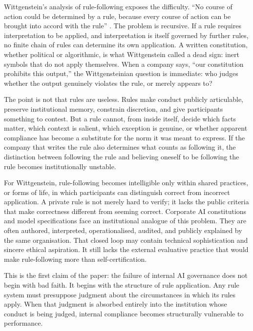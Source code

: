 \documentclass[11pt,a4paper]{article}
\begin{document}
Wittgenstein's analysis of rule-following exposes the difficulty. ``No course of action could be determined by a rule, because every course of action can be brought into accord with the rule'' \citep[\S201]{wittgenstein1953investigations}. The problem is recursive. If a rule requires interpretation to be applied, and interpretation is itself governed by further rules, no finite chain of rules can determine its own application. A written constitution, whether political or algorithmic, is what Wittgenstein called a dead sign: inert symbols that do not apply themselves. When a company says, ``our constitution prohibits this output,'' the Wittgensteinian question is immediate: who judges whether the output genuinely violates the rule, or merely appears to?

The point is not that rules are useless. Rules make conduct publicly articulable, preserve institutional memory, constrain discretion, and give participants something to contest. But a rule cannot, from inside itself, decide which facts matter, which context is salient, which exception is genuine, or whether apparent compliance has become a substitute for the norm it was meant to express. If the company that writes the rule also determines what counts as following it, the distinction between following the rule and believing oneself to be following the rule becomes institutionally unstable.

For Wittgenstein, rule-following becomes intelligible only within shared practices, or forms of life, in which participants can distinguish correct from incorrect application. A private rule is not merely hard to verify; it lacks the public criteria that make correctness different from seeming correct. Corporate AI constitutions and model specifications face an institutional analogue of this problem. They are often authored, interpreted, operationalised, audited, and publicly explained by the same organisation. That closed loop may contain technical sophistication and sincere ethical aspiration. It still lacks the external evaluative practice that would make rule-following more than self-certification.

This is the first claim of the paper: the failure of internal AI governance does not begin with bad faith. It begins with the structure of rule application. Any rule system must presuppose judgment about the circumstances in which its rules apply. When that judgment is absorbed entirely into the institution whose conduct is being judged, internal compliance becomes structurally vulnerable to performance.
\end{document}
